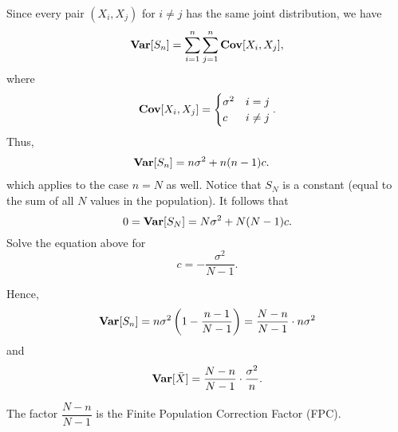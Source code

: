 \documentclass[UTF8,a4paper,10pt]{article}
\begin{document}
Since every pair $(X_i, X_j)$ for $i \neq j$ has the same joint distribution, we have
\begin{align*}
    \operatorname{\textbf{Var}}[S_n] = \sum_{i=1}^{n}\sum_{j=1}^{n}\operatorname{\textbf{Cov}}[X_i,X_j],
\end{align*}
where 
\[\operatorname{\textbf{Cov}}[X_i,X_j] = \begin{cases}
     \sigma^2 & i=j\\
    c  & i\neq j\\
\end{cases}.\]
Thus,
\begin{align*}
    \operatorname{\textbf{Var}}[S_n] 
    &= n\sigma^2 + n(n-1)c.\label{eq.01}
\end{align*}
which applies to the case $n=N$ as well. Notice that $S_N$ is a constant (equal to the sum of all $N$ values in the population). It follows that
\[
0 = \operatorname{\textbf{Var}}[S_N] = N\sigma^2 + N(N-1)c.
\]
Solve the equation above for $$c = -\frac{\sigma^2}{N-1}.$$

Hence,
\[
\operatorname{\textbf{Var}}[S_n] = n\sigma^2\left(1 - \frac{n-1}{N-1}\right) = \frac{N-n}{N-1} \cdot n\sigma^2
\]
and
\[
\operatorname{\textbf{Var}}[\bar{X}] = \frac{N-n}{N-1} \cdot \frac{\sigma^2}{n}.
\]

The factor \(\dfrac{N-n}{N-1}\) is the Finite Population Correction Factor (FPC).
\end{document}
